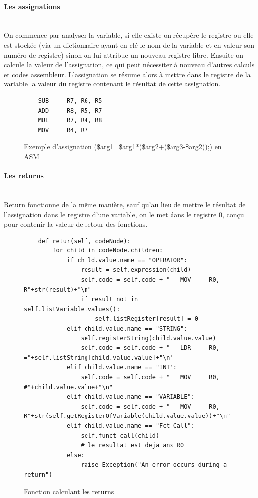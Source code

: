 \documentclass[a4paper,10pt]{article}
\begin{document}
		\paragraph{Les assignations}~\\
			On commence par analyser la variable, si elle existe on récupère le registre ou elle est stockée (via un dictionnaire ayant en clé le nom de la variable et en valeur son numéro de registre) sinon on lui attribue un nouveau registre libre. Ensuite on calcule la valeur de l'assignation, ce qui peut nécessiter à nouveau d'autres calculs et codes assembleur. L'assignation se résume alors à mettre dans le registre de la variable la valeur du registre contenant le résultat de cette assignation.
				\begin{figure}[H]
\begin{lstlisting}
	SUB		R7, R6, R5
	ADD		R8, R5, R7
	MUL		R7, R4, R8
	MOV 	R4, R7
\end{lstlisting}
\fontfamily{}
\caption{Exemple d'assignation (\$arg1=\$arg1*(\$arg2+(\$arg3-\$arg2));) en ASM}
\label{lst:ExAssignation}
\end{figure}		
		
		\paragraph{Les returns}~\\
			Return fonctionne de la même manière, sauf qu'au lieu de mettre le résultat de l'assignation dans le registre d'une variable, on le met dans le registre 0, conçu pour contenir la valeur de retour des fonctions.
				\begin{figure}[H]
\begin{lstlisting}
	def retur(self, codeNode):
		for child in codeNode.children:
			if child.value.name == "OPERATOR": 
				result = self.expression(child)
				self.code = self.code + "	MOV 	R0, R"+str(result)+"\n"
				if result not in self.listVariable.values():
					self.listRegister[result] = 0					
			elif child.value.name == "STRING": 
				self.registerString(child.value.value)
				self.code = self.code + "	LDR 	R0, ="+self.listString[child.value.value]+"\n"
			elif child.value.name == "INT": 
				self.code = self.code + "	MOV 	R0, #"+child.value.value+"\n"				
			elif child.value.name == "VARIABLE": 
				self.code = self.code + "	MOV 	R0, R"+str(self.getRegisterOfVariable(child.value.value))+"\n"				
			elif child.value.name == "Fct-Call": 
				self.funct_call(child)
				# le resultat est deja ans R0		
			else:
				raise Exception("An error occurs during a return")
\end{lstlisting}
\fontfamily{}
\caption{Fonction calculant les returns}
\label{lst:ExReturn}
\end{figure}	
\end{document}
